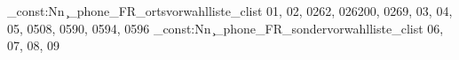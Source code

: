 \clist_const:Nn \c_phone_FR_ortsvorwahlliste_clist {01,
02,
0262,
026200,
0269,
03,
04,
05,
0508,
0590,
0594,
0596}
\clist_const:Nn \c_phone_FR_sondervorwahlliste_clist {06,
07,
08,
09}

